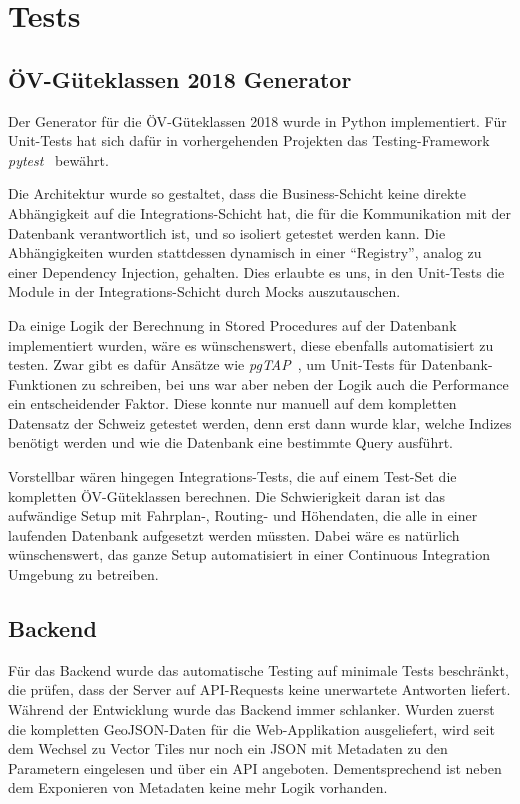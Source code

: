 \cleardoublepage
\section{Tests}
\label{Tests}

\subsection{ÖV-Güteklassen 2018 Generator}
\label{Tests:ÖV-Güteklassen 2018 Generator}

Der Generator für die \acs{ÖV}-Güteklassen 2018 wurde in Python implementiert.
Für Unit-Tests hat sich dafür in vorhergehenden Projekten das Testing-Framework \emph{pytest}~\cite{pytest} bewährt.

Die Architektur wurde so gestaltet, dass die Business-Schicht keine direkte Abhängigkeit auf die Integrations-Schicht hat, die für die Kommunikation mit der Datenbank verantwortlich ist, und so isoliert getestet werden kann.
Die Abhängigkeiten wurden stattdessen dynamisch in einer "`Registry"', analog zu einer Dependency Injection, gehalten.
Dies erlaubte es uns, in den Unit-Tests die Module in der Integrations-Schicht durch Mocks auszutauschen.

Da einige Logik der Berechnung in Stored Procedures auf der Datenbank implementiert wurden, wäre es wünschenswert, diese ebenfalls automatisiert zu testen.
Zwar gibt es dafür Ansätze wie \emph{pgTAP}~\cite{pgTAP}, um Unit-Tests für Datenbank-Funktionen zu schreiben, bei uns war aber neben der Logik auch die Performance ein entscheidender Faktor.
Diese konnte nur manuell auf dem kompletten Datensatz der Schweiz getestet werden, denn erst dann wurde klar, welche Indizes benötigt werden und wie die Datenbank eine bestimmte Query ausführt.

Vorstellbar wären hingegen Integrations-Tests, die auf einem Test-Set die kompletten \acs{ÖV}-Güteklassen berechnen.
Die Schwierigkeit daran ist das aufwändige Setup mit Fahrplan-, Routing- und Höhendaten, die alle in einer laufenden Datenbank aufgesetzt werden müssten.
Dabei wäre es natürlich wünschenswert, das ganze Setup automatisiert in einer Continuous Integration Umgebung zu betreiben.

\subsection{Backend}
\label{Tests:Backend}

Für das Backend wurde das automatische Testing auf minimale Tests beschränkt, die prüfen, dass der Server auf API-Requests keine unerwartete Antworten liefert.
Während der Entwicklung wurde das Backend immer schlanker.
Wurden zuerst die kompletten GeoJSON-Daten für die Web-Applikation ausgeliefert, wird seit dem Wechsel zu Vector Tiles nur noch ein JSON mit Metadaten zu den Parametern eingelesen und über ein API angeboten.
Dementsprechend ist neben dem Exponieren von Metadaten keine mehr Logik vorhanden.

